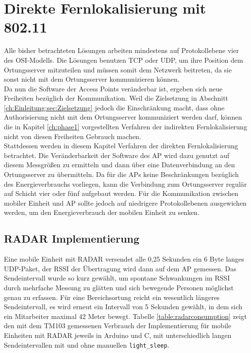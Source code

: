 \chapter{Direkte Fernlokalisierung mit 802.11}
\label{ch:phase2}
Alle bisher betrachteten Lösungen arbeiten mindestens auf Protokollebene vier des OSI-Modells.
Die Lösungen benutzen TCP oder UDP, um ihre Position dem Ortungsserver mitzuteilen und müssen somit dem Netzwerk beitreten, da sie sonst nicht mit dem Ortungsserver kommunizieren können.\\
Da nun die Software der Access Points veränderbar ist, ergeben sich neue Freiheiten bezüglich der Kommunikation.
Weil die Zielsetzung in Abschnitt \ref{ch:Einleitung:sec:Zielsetzung} jedoch die Einschränkung macht, dass ohne Authorisierung nicht mit dem Ortungsserver kommuniziert werden darf, können die in Kapitel \ref{ch:phase1} vorgestellten Verfahren der indirekten Fernlokalisierung nicht von diesen Freiheiten Gebrauch machen.\\
Stattdessen werden in diesem Kapitel Verfahren der direkten Fernlokalisierung betrachtet.
Die Veränderbarkeit der Software des AP wird dazu genutzt auf diesem Messgrößen zu ermitteln und dann über eine Datenverbindung an den Ortungsserver zu übermitteln.
Da für die APs keine Beschränkungen bezüglich des Energieverbrauchs vorliegen, kann die Verbindung zum Ortungsserver regulär auf Schicht vier oder fünf aufgebaut werden.
Für die Kommunikation zwischen mobiler Einheit und AP sollte jedoch auf niedrigere Protokollebenen ausgewichen werden, um den Energieverbrauch der mobilen Einheit zu senken. \\

\section{RADAR Implementierung}
Eine mobile Einheit mit RADAR versendet alle 0,25 Sekunden ein 6 Byte langes UDP-Paket, der RSSI der Übertragung wird dann auf dem AP gemessen.
Das Sendeintervall wurde so kurz gewählt, um spontane Schwankungen im RSSI durch mehrfache Messung zu glätten und sich bewegende Personen möglichst genau zu erfassen.
Für eine Bereichsortung reicht ein wesentlich längeres Sendeintervall, es wird erneut ein Intervall von 5 Sekunden gewählt, in dem sich ein Mitarbeiter maximal 42 Meter bewegt. 
Tabelle \ref{table:radarconsumption} zeigt den mit dem TM103 gemessenen Verbrauch der Implementierung für mobile Einheiten mit RADAR jeweils in Arduino und C, mit unterschiedlich langen Sendeintervallen mit und ohne manuellen \texttt{light\_sleep}.

